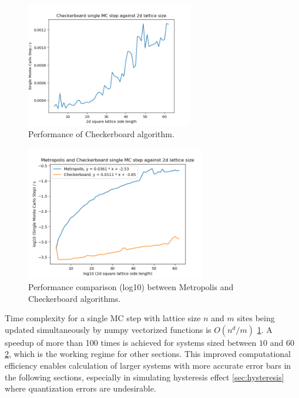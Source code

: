\documentclass[%
showkeys,
bibnotes,
amsmath,amssymb,
floatfix,
]{revtex4-1}
\begin{document}
\begin{figure}[H] \centering
	\includegraphics[width=0.65\textwidth]{../figures/checkerboard_performance}
	\caption{\label{fig:checkerboard_performance} Performance of Checkerboard algorithm.}
\end{figure}

\begin{figure}[H] \centering
	\includegraphics[width=0.7\textwidth]{../figures/comparison_performance}
	\caption{\label{fig:comparison_performance} Performance comparison (log10) between Metropolis and Checkerboard algorithms.}
\end{figure}

Time complexity for a single MC step with lattice size $n$ and $m$ sites being updated simultaneously by numpy vectorized functions is $O(n^{d} / m)$ \ref{fig:checkerboard_performance}. A speedup of more than 100 times is achieved for systems sized between $10$ and $60$ \ref{fig:comparison_performance}, which is the working regime for other sections. This improved computational efficiency enables calculation of larger systems with more accurate error bars in the following sections, especially in simulating hysteresis effect \ref{sec:hysteresis} where quantization errors are undesirable.
\end{document}
